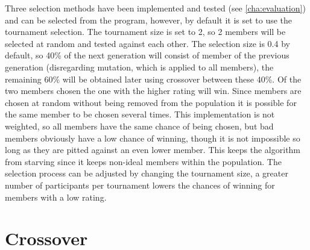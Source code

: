 Three selection methods have been implemented and tested (see \ref{cha:evaluation}) and can be selected from the program, however, by default it is set to use the tournament selection. The tournament size is set to 2, so 2 members will be selected at random and tested against each other. The selection size is 0.4 by default, so 40\% of the next generation will consist of member of the previous generation (disregarding mutation, which is applied to all members), the remaining 60\% will be obtained later using crossover between these 40\%. Of the two members chosen the one with the higher rating will win. Since members are chosen at random without being removed from the population it is possible for the same member to be chosen several times. This implementation is not weighted, so all members have the same chance of being chosen, but bad members obviously have a low chance of winning, though it is not impossible so long as they are pitted against an even lower member. This keeps the algorithm from starving since it keeps non-ideal members within the population. The selection process can be adjusted by changing the tournament size, a greater number of participants per tournament lowers the chances of winning for members with a low rating.

\section{Crossover} %
\label{sec:imp_crossover}

